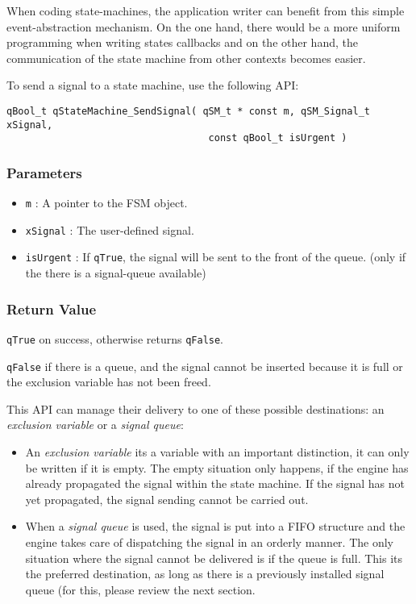 When coding state-machines, the application writer can benefit from this simple event-abstraction mechanism. On the one hand, there would be a more uniform programming when writing states callbacks and on the other hand, the communication of the state machine from other contexts becomes easier.

To send a signal to a state machine, use the following API:
\medskip

\begin{lstlisting}[style=CStyle]
 qBool_t qStateMachine_SendSignal( qSM_t * const m, qSM_Signal_t xSignal, 
                                   const qBool_t isUrgent )
\end{lstlisting} 

\subsubsection*{Parameters}
\begin{itemize}
    \item \lstinline{m} : A pointer to the FSM object. 
    \item \lstinline{xSignal} : The user-defined signal.
    \item \lstinline{isUrgent} : If \lstinline{qTrue}, the signal will be sent to the front of the queue. (only if the there is a signal-queue available)
\end{itemize}

\subsubsection*{Return Value}
\lstinline{qTrue} on success, otherwise returns \lstinline{qFalse}.

\lstinline{qFalse} if there is a queue, and the signal cannot be inserted because it is full or the exclusion variable has not been freed.

\hrulefill
\medskip

This API can manage their delivery to one of these possible destinations: an \textit{exclusion variable} or a \textit{signal queue}:
\begin{itemize}
    \item An \textit{exclusion variable} its a variable with an important distinction, it can only be written if it is empty. The empty situation only happens, if the engine has already propagated the signal within the state machine. If the signal has not yet propagated, the signal sending cannot be carried out.
    \item When a \textit{signal queue} is used, the signal is put into a FIFO structure and the engine takes care of dispatching the signal in an orderly manner. The only situation where the signal cannot be delivered is if the queue is full.
    This its the preferred destination, as long as there is a previously installed signal queue (for this, please review the next section.
\end{itemize}

